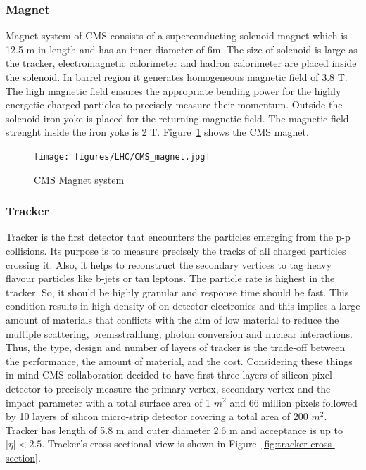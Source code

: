 \subsubsection{Magnet} %
\label{ssub:magnet}
Magnet system of CMS consists of a superconducting solenoid magnet which is 12.5 m in length and has an inner diameter of 6m. The size of solenoid is large as the tracker, electromagnetic calorimeter and hadron calorimeter are placed inside the solenoid. In barrel region it generates homogeneous magnetic field of 3.8 T. The high magnetic field ensures the appropriate bending power for the highly energetic charged particles to precisely measure their momentum. Outside the solenoid iron yoke is placed for the returning magnetic field. The magnetic field strenght inside the iron yoke is 2 T. Figure~\ref{fig:CMS-magnet} shows the CMS magnet.

\begin{figure}[!htbp]
	\centering
	\texttt{[image: figures/LHC/CMS\_magnet.jpg]}
	\caption{CMS Magnet system}
	\label{fig:CMS-magnet}
\end{figure}

\subsubsection{Tracker} %
\label{ssub:tracker}
Tracker is the first detector that encounters the particles emerging from the p-p collisions. Its purpose is to measure precisely the tracks of all charged particles crossing it. Also, it helps to reconstruct the secondary vertices to tag heavy flavour particles like b-jets or tau leptons. The particle rate is highest in the tracker. So, it should be highly granular and response time should be fast. This condition results in high density of on-detector electronics and this implies a large amount of materials that conflicts with the aim of low material to reduce the multiple scattering, bremsstrahlung, photon conversion and nuclear interactions. Thus, the type, design and number of layers of tracker is the trade-off between the performance, the amount of material, and the cost. Considering these things in mind CMS collaboration decided to have first three layers of silicon pixel detector to precisely measure the primary vertex, secondary vertex and the impact parameter with a total surface area of 1 $m^2$ and 66 million pixels followed by 10 layers of  silicon micro-strip detector covering a total area of 200 $m^2$. Tracker has length of 5.8 m and outer diameter 2.6 m and acceptance is up to $|\eta|<2.5$. Tracker's cross sectional view is shown in Figure~\ref{fig:tracker-cross-section}.

